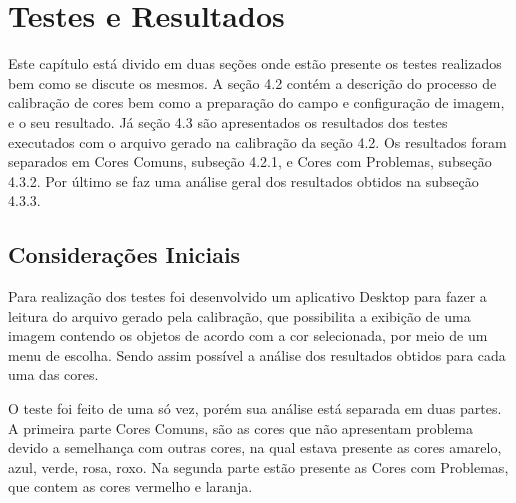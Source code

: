 % 
\chapter{Testes e Resultados} 
Este capítulo está divido em duas seções onde estão presente os testes realizados bem como se discute os mesmos. A seção 4.2 contém a descrição do processo de calibração de cores bem como a preparação do campo e configuração de imagem, e o seu resultado. Já seção 4.3 são apresentados os resultados dos testes executados com o arquivo gerado na calibração da seção 4.2. Os resultados foram separados em Cores Comuns, subseção 4.2.1,  e Cores com Problemas, subseção 4.3.2. Por último se faz uma análise geral dos resultados obtidos na subseção 4.3.3.
\section{Considerações Iniciais}
 Para realização dos testes foi desenvolvido um aplicativo Desktop para fazer a leitura do arquivo gerado pela calibração, que possibilita a exibição de uma imagem contendo os objetos de acordo com a cor selecionada, por meio de um menu de escolha. Sendo assim possível a análise dos resultados obtidos para cada uma das cores. 
 
  O teste foi feito de uma só vez, porém sua análise está separada em duas partes. A primeira parte Cores Comuns, são as cores que não apresentam problema devido a semelhança com outras cores, na qual estava presente as cores amarelo, azul, verde, rosa, roxo. Na segunda parte estão presente as Cores com Problemas, que contem as cores vermelho e laranja. 
 
